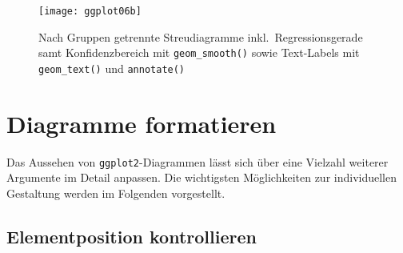 \begin{figure}[ht]
\centering
\texttt{[image: ggplot06b]}
\vspace*{-0.5em}
\caption{Nach Gruppen getrennte Streudiagramme inkl.\ Regressionsgerade samt Konfidenzbereich mit \lstinline!geom_smooth()! sowie Text-Labels mit \lstinline!geom_text()! und \lstinline!annotate()!}
\label{fig:ggplot06b}
\end{figure}

\section{Diagramme formatieren}
\label{sec:ggplotFormat}

Das Aussehen von \lstinline!ggplot2!-Diagrammen lässt sich über eine Vielzahl weiterer Argumente im Detail anpassen. Die wichtigsten Möglichkeiten zur individuellen Gestaltung werden im Folgenden vorgestellt.

\subsection{Elementposition kontrollieren}
\label{sec:ggplotPos}

